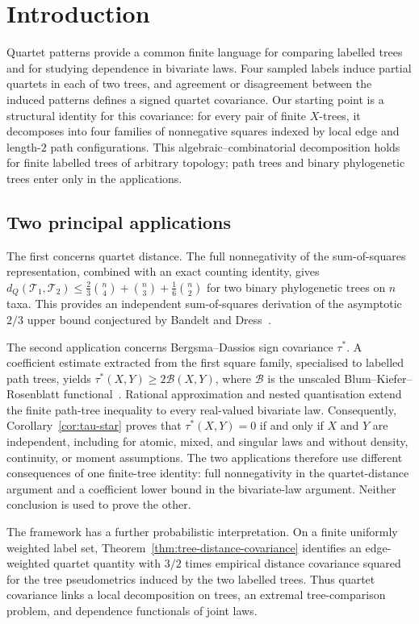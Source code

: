 \documentclass[pdflatex,sn-mathphys-num]{sn-jnl}
\theoremstyle{thmstyleone}
\begin{document}
\section{Introduction}

Quartet patterns provide a common finite language for comparing labelled
trees and for studying dependence in bivariate laws.  Four sampled labels
induce partial quartets in each of two trees, and agreement or disagreement
between the induced patterns defines a signed quartet covariance.  Our
starting point is a structural identity for this covariance: for every pair
of finite $X$-trees, it decomposes into four families of nonnegative squares
indexed by local edge and length-$2$ path configurations.  This
algebraic--combinatorial decomposition holds for finite labelled trees of
arbitrary topology; path trees and binary phylogenetic trees enter only in
the applications.

\subsection{Two principal applications}
The first concerns quartet distance.  The full nonnegativity of the
sum-of-squares representation, combined with an exact counting
identity, gives
$d_Q(\mathcal T_1,\mathcal T_2)\le
\frac23\binom n4+\binom n3+\frac16\binom n2$ for two binary phylogenetic
trees on $n$ taxa.  This provides an independent sum-of-squares derivation of
the asymptotic $2/3$ upper bound conjectured by Bandelt and
Dress~\cite{BandeltDress1986}.

The second application concerns Bergsma--Dassios sign covariance $\tau^*$.
A coefficient estimate extracted from the first square family, specialised
to labelled path trees, yields
$\tau^*(X,Y)\ge2\mathcal B(X,Y)$, where $\mathcal B$ is the unscaled
Blum--Kiefer--Rosenblatt functional~\cite{BlumKieferRosenblatt1961}.  Rational
approximation and nested quantisation extend the finite path-tree inequality
to every real-valued bivariate law.  Consequently,
Corollary~\ref{cor:tau-star} proves that $\tau^*(X,Y)=0$ if and only if $X$
and $Y$ are independent, including for atomic, mixed, and singular laws and
without density, continuity, or moment assumptions.  The two applications
therefore use different
consequences of one finite-tree identity: full nonnegativity in the
quartet-distance argument and a coefficient lower bound in the bivariate-law
argument.  Neither conclusion is used to prove the other.

The framework has a further probabilistic interpretation.  On a finite
uniformly weighted label set, Theorem~\ref{thm:tree-distance-covariance}
identifies an edge-weighted quartet quantity with $3/2$ times empirical
distance covariance squared for the tree pseudometrics induced by the two
labelled trees.  Thus quartet covariance links a local decomposition on
trees, an extremal tree-comparison problem, and dependence functionals of
joint laws.
\end{document}
